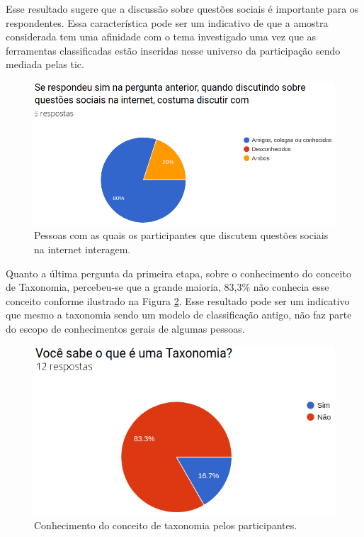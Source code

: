 \par
Esse resultado sugere que a discussão sobre questões sociais é importante para os respondentes. Essa característica pode ser um indicativo de que a amostra 
considerada tem uma afinidade com o tema investigado uma vez que as ferramentas classificadas estão inseridas nesse universo da participação sendo mediada pelas \acrshort{tic}. 

\begin{figure}[!ht]
    \centering
    \includegraphics[scale=0.4]{./figuras/discutir_com.png}
    \caption{Pessoas com as quais os participantes que discutem questões sociais na internet interagem.}
    \label{fig:grafico-discu-alvo}
\end{figure}

\par
Quanto a última pergunta da primeira etapa, sobre o conhecimento do conceito de Taxonomia, percebeu-se que a grande maioria, 83,3\% não conhecia esse conceito conforme ilustrado na 
Figura \ref{fig:grafico-conhe-taxonomia}. Esse resultado pode ser um indicativo que mesmo a taxonomia sendo um modelo de classificação antigo, 
não faz parte do escopo de conhecimentos gerais de algumas pessoas.

\begin{figure}[!ht]
    \centering
    \includegraphics[scale=0.4]{./figuras/sabe_taxonomia.png}
    \caption{Conhecimento do conceito de taxonomia pelos participantes.}
    \label{fig:grafico-conhe-taxonomia}
\end{figure}

